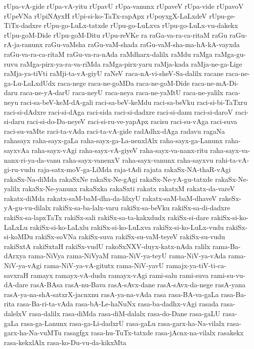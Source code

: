 {rUpa-vA-gide
rUpa-vA-yitu
rUpavU
rUpa-vanunx
rUpaveV
rUpa-vide
rUpavoV
rUpeVNa
rUpiNAyxH
rUpi-si-ko-TaTx-rapApx
rUpoyxgX-LaLxdeV
rUpu-ge-TiTx-dadxre
rUpu-go-LuLx-tatxde
rUpu-go-LuLxva
rUpu-go-LuLx-vu-dakekx
rUpu-goM-Dide
rUpu-goM-Ditu
rUpu-reVKe
ra
raGa-va-ra-ca-ritaM
raGu
raGu-rA-ja-ranunx
raGu-vaMsha
raGu-vaM-shada
raGu-vaM-sha-ma-hA-kA-vayxda
raGu-va-ra-ca-ritaM
raGu-va-ra-nAda
raMdharx-dalilx
raMdu
raMga
raMga-gu-ruvu
raMga-pirx-ya-ra-va-riMda
raMga-pirx-yaru
raMja-kada
raMja-ne-ga-Lige
raMja-ya-tiVti
raMji-ta-vA-giyU
raNeV
raca-nA-vi-sheV-Sa-dalilx
racane
raca-ne-ga-Lu-LaLxdUdx
raca-nege
raca-ne-goMDa
raca-ne-goM-Dide
raca-ne-mA-Di-daru
raca-ne-yA-darU
raca-neyU
raca-neya
raca-ne-yaMtU
raca-ne-yalilx
raca-neyu
raci-sa-beV-keM-dA-gali
raci-sa-beV-keMdu
raci-sa-beVku
raci-si-bi-TaTxru
raci-si-dAdxre
raci-si-dAga
raci-sida
raci-si-dadxre
raci-si-danu
raci-si-daroV
raci-si-daru
raci-si-do-Da-neyeV
raci-si-ru-ve-yapApx
racisu
raci-su-vAga
raci-suva
raci-su-vaMte
raci-ta-vAda
raci-ta-vA-gide
radAdhx-dAga
radavu
ragaNa
rahasayx
raha-sayx-gaLa
raha-sayx-ga-La-nenxlAlx
raha-sayx-ga-Lanunx
raha-sayxvAa
raha-sayx-vAgi
raha-sayx-vA-giyeV
raha-sayx-va-nanx-ritu
raha-sayx-va-nanx-ri-ya-da-vanu
raha-sayx-vanenxV
raha-sayx-vanunx
raha-sayxvu
rahi-ta-vA-gi-ru-vudu
raja-satx-moV-ga-LiMda
raja-tAdi
rajata
rakaSx-NA-thaR-vAgi
rakaSx-Na-diMda
rakaSxNe
rakaSx-Ne-gAgi
rakaSx-Ne-yA-gu-tatxde
rakaSx-Ne-yalilx
rakaSx-Ne-yanunx
rakaSxka
rakaSxti
rakatx
rakatxM
rakatx-da-vareV
rakatx-diMda
rakatx-saM-baM-dha-da-lilxyU
rakatx-saM-baM-dhaveV
rakeSx-yA-gu-vu-dilalx
rakiSx-sa-ba-lalx-varu
rakiSx-sa-beVku
rakiSx-sa-di-dadxre
rakiSx-sa-lapxTaTx
rakiSx-sali
rakiSx-sa-ta-kakxdudx
rakiSx-si-dare
rakiSx-si-ko-LaLxLu
rakiSx-si-ko-LaLxlu
rakiSx-si-ko-LuLxva
rakiSx-si-ko-LuLx-vudu
rakiSx-si-koMDu
rakiSx-soVNa
rakiSx-suva
rakiSx-su-vaM-teyeV
rakiSx-su-vudu
rakiSxtA
rakiSxtaH
rakiSx-vudU
rakoSxNXV-duyx-katx-nAda
ralilx
rama-Ba-dArxya
rama-NiVya
rama-NiVyaM
rama-NiV-ya-teyU
rama-NiV-ya-vAda
rama-NiV-ya-vAgi
rama-NiV-ya-vA-gitutx
rama-NiV-yavU
ramajx-ya-tiV-ti-ca-savxraH
ramayx
ramayx-vA-dudu
ramayx-vAgi
rami-salu
rami-suva
rami-su-vu-dA-dare
rasA-BAsa
rasA-nu-Bava
rasA-sAvx-dane
rasA-sAvx-da-nege
rasA-yana
rasA-ya-na-shA-satxrX-jacnxnu
rasA-ya-na-vAda
rasa
rasa-BA-va-gaLa
rasa-Ba-rita
rasa-Ba-ri-ta-vAda
rasa-bA-Le-haNuNx
rasa-ba-dadhx-vAgi
rasada
rasa-dalelxV
rasa-dalilx
rasa-diMda
rasa-diM-dalalx
rasa-do-Dane
rasa-gaLU
rasa-gaLa
rasa-ga-Lanunx
rasa-ga-Li-dadxrU
rasa-gaLu
rasa-garx-ha-Na-vilalx
rasa-garx-ha-Na-vuMTu
rasagfgx
rasa-hu-TuTx-tatxde
rasa-jAcnx-na-vilalx
rasakekx
rasa-kekxlAlx
rasa-ko-Du-vu-da-kikxMta
}
